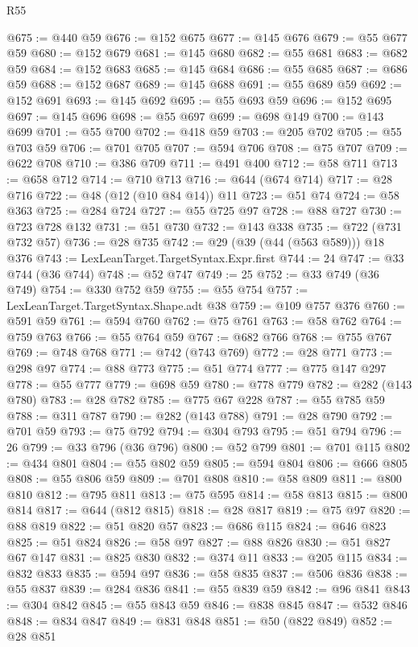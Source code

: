 \begin{lexlean}{R55}
\begin{coremodule}
@675 := @440 @59
@676 := @152 @675
@677 := @145 @676
@679 := @55 @677 @59
@680 := @152 @679
@681 := @145 @680
@682 := @55 @681
@683 := @682 @59
@684 := @152 @683
@685 := @145 @684
@686 := @55 @685
@687 := @686 @59
@688 := @152 @687
@689 := @145 @688
@691 := @55 @689 @59
@692 := @152 @691
@693 := @145 @692
@695 := @55 @693 @59
@696 := @152 @695
@697 := @145 @696
@698 := @55 @697
@699 := @698 @149
@700 := @143 @699
@701 := @55 @700
@702 := @418 @59
@703 := @205 @702
@705 := @55 @703 @59
@706 := @701 @705
@707 := @594 @706
@708 := @75 @707
@709 := @622 @708
@710 := @386 @709
@711 := @491 @400
@712 := @58 @711
@713 := @658 @712
@714 := @710 @713
@716 := @644 (@674 @714)
@717 := @28 @716
@722 := @48 (@12 (@10 @84 @14)) @11
@723 := @51 @74
@724 := @58 @363
@725 := @284 @724
@727 := @55 @725 @97
@728 := @88 @727
@730 := @723 @728 @132
@731 := @51 @730
@732 := @143 @338
@735 := @722 (@731 @732 @57)
@736 := @28 @735
@742 := @29 (@39 (@44 (@563 @589))) @18 @376
@743 := LexLeanTarget.TargetSyntax.Expr.first
@744 := 24
@747 := @33 @744 (@36 @744)
@748 := @52 @747
@749 := 25
@752 := @33 @749 (@36 @749)
@754 := @330 @752 @59
@755 := @55 @754
@757 := LexLeanTarget.TargetSyntax.Shape.adt @38
@759 := @109 @757 @376
@760 := @591 @59
@761 := @594 @760
@762 := @75 @761
@763 := @58 @762
@764 := @759 @763
@766 := @55 @764 @59
@767 := @682 @766
@768 := @755 @767
@769 := @748 @768
@771 := @742 (@743 @769)
@772 := @28 @771
@773 := @298 @97
@774 := @88 @773
@775 := @51 @774
@777 := @775 @147 @297
@778 := @55 @777
@779 := @698 @59
@780 := @778 @779
@782 := @282 (@143 @780)
@783 := @28 @782
@785 := @775 @67 @228
@787 := @55 @785 @59
@788 := @311 @787
@790 := @282 (@143 @788)
@791 := @28 @790
@792 := @701 @59
@793 := @75 @792
@794 := @304 @793
@795 := @51 @794
@796 := 26
@799 := @33 @796 (@36 @796)
@800 := @52 @799
@801 := @701 @115
@802 := @434 @801
@804 := @55 @802 @59
@805 := @594 @804
@806 := @666 @805
@808 := @55 @806 @59
@809 := @701 @808
@810 := @58 @809
@811 := @800 @810
@812 := @795 @811
@813 := @75 @595
@814 := @58 @813
@815 := @800 @814
@817 := @644 (@812 @815)
@818 := @28 @817
@819 := @75 @97
@820 := @88 @819
@822 := @51 @820 @57
@823 := @686 @115
@824 := @646 @823
@825 := @51 @824
@826 := @58 @97
@827 := @88 @826
@830 := @51 @827 @67 @147
@831 := @825 @830
@832 := @374 @11
@833 := @205 @115
@834 := @832 @833
@835 := @594 @97
@836 := @58 @835
@837 := @506 @836
@838 := @55 @837
@839 := @284 @836
@841 := @55 @839 @59
@842 := @96 @841
@843 := @304 @842
@845 := @55 @843 @59
@846 := @838 @845
@847 := @532 @846
@848 := @834 @847
@849 := @831 @848
@851 := @50 (@822 @849)
@852 := @28 @851

\end{coremodule}
\end{lexlean}

